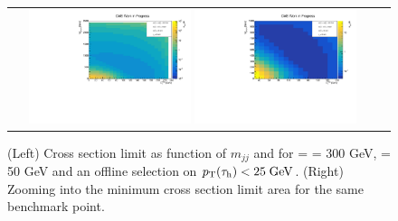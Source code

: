 \begin{figure}[tbh!]
	\centering
	\begin{tabular}{cc}
		\includegraphics[width=0.45\textwidth]{analysis/pics/JetInvMass_vs_MET_xsec_chi300_lsp050_taupt25.pdf}
		\includegraphics[width=0.45\textwidth]{analysis/pics/JetInvMass_vs_MET_xsec_chi300_lsp050_taupt25_zoom.pdf}
	\end{tabular}
	\caption{(Left) Cross section limit as function of $m_{jj}$ and \met for \charginopm = \neutralinotwo = 300 GeV, \neutralinoone = 50 GeV and an offline selection on $p_{\text{T}}(\tau_{\text{h}}) <  25\;\text{Ge}\kern-0.06667em\text{V}$. (Right) Zooming into the minimum cross section limit area for the same benchmark point.}
	\label{fig::JetInvMass_vs_MET_xsec_chi300_lsp050_taupt25}
\end{figure}

